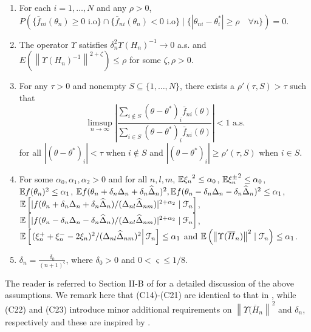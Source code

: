 \begin{enumerate}[label=(\textbf{C\arabic*}),resume]
\item For each $i=1,\ldots,N$ and any $\rho>0$, 
$P(\{ \bar f_{ni} (\theta_n) \ge 0 \text{ i.o}\} \cap \{ \bar f_{ni} (\theta_n) < 0 \text{ i.o}\} \mid \{ |\theta_{ni} - \theta^*_i| \ge \rho\quad \forall n\}) =0.$

\item The operator $\Upsilon$ satisfies $\delta_n^2 \Upsilon(H_n)^{-1} \rightarrow 0$ a.s. and  $E(\left\| \Upsilon(H_n)^{-1}\right\|^{2+\zeta}) \le \rho$ for some $\zeta, \rho>0$.

\item For any $\tau >0$ and nonempty $S \subseteq \{1,\ldots,N\}$, there exists a $\rho'(\tau,S)>\tau$ such that 
$$ \limsup_{n\rightarrow \infty} \left| \dfrac{\sum_{i \notin S} (\theta-\theta^*)_i \bar f_{ni}(\theta)}{\sum_{i \in S} (\theta-\theta^*)_i \bar f_{ni}(\theta)}               \right| < 1 \text{ a.s.}$$
for all $|(\theta-\theta^*)_i| < \tau$ when $i \notin S$ and $|(\theta-\theta^*)_i| \ge \rho'(\tau,S)$ when $i\in S$.
\item For some $\alpha_0, \alpha_1, \alpha_2 >0$ and for all $n,l,m$, $\mathbb{E} {\xi_n}^{2} \le \alpha_0$, $\mathbb{E} {\xi_n^{\pm}}^{2} \le \alpha_0$, $\mathbb{E} f(\theta_n)^{2} \le \alpha_1$,  $\mathbb{E} f(\theta_n + \delta_n \Delta_n + \delta_n \widehat \Delta_n)^{2},\mathbb{E} f(\theta_n - \delta_n \Delta_n - \delta_n \widehat \Delta_n)^{2} \le \alpha_1$, 
$\mathbb{E} \left[| f(\theta_n + \delta_n \Delta_n + \delta_n \widehat \Delta_n)/ (\Delta_{nl}\widehat\Delta_{nm})|^{2+\alpha_2} \mid \mathcal{F}_n\right]$,
$\mathbb{E} \left[ |f(\theta_n - \delta_n \Delta_n - \delta_n \widehat \Delta_n)/ (\Delta_{nl}\widehat\Delta_{nm})|^{2+\alpha_2} \mid \mathcal{F}_n\right]$,
 $\mathbb{E}\left[\left. (\xi_n^+ + \xi_n^- - 2 \xi_n)^2/(\Delta_{nl}\widehat\Delta_{nm})^2 \right| \mathcal{F}_n \right] \le \alpha_1$ 
and $\mathbb{E} \left(\left\| \Upsilon(\overline H_n) \right\|^2 \mid \mathcal{F}_n\right) \le \alpha_1$. 
\item  $\delta_n = \frac{\delta_0}{(n+1)^{\varsigma}}$, where $\delta_0 > 0$ and $0 < \varsigma \le 1/8$.
\end{enumerate}
The reader is referred to Section II-B of \cite{prashanth2015rdsa} for a detailed discussion of the above assumptions. We remark here that (C14)-(C21) are identical to that in \cite{prashanth2015rdsa}, while (C22) and (C23) introduce minor additional requirements on $\left\| \Upsilon(\overline H_n \right\|^2$ and $\delta_n$, respectively and these are inspired by \cite{spall-jacobian}.

